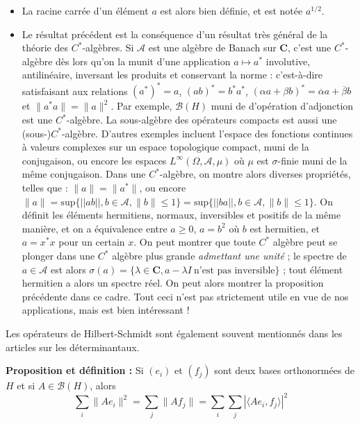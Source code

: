 \documentclass[12pt]{article}
\let\oldsum\sum
\renewcommand{\sum}{\oldsum\limits}
\begin{document}
\begin{itemize}

  \item La racine carrée d'un élément $a$ est alors bien définie, et est notée $ a^{1/2} $.
  
  \item Le résultat précédent est la conséquence d'un résultat très général de la théorie des $C^*$-algèbres. Si $ \mathcal A$ est une algèbre de Banach sur $\mathbf C$, c'est une $C^*$-algèbre dès lors qu'on la munit d'une application $ a \mapsto a^* $ involutive, antilinéaire, inversant les produits et conservant la norme : c'est-à-dire satisfaisant aux relations $ (a^*)^* = a$, $ (ab)^* = b^* a^* $,  $(\alpha a + \beta b)^* = \overline \alpha a + \overline \beta b $ et $ \| a^* a \| = \|a \|^2 $. Par exemple, $\mathcal B(H)$ muni de d'opération d'adjonction est une $ C^* $-algèbre. La sous-algèbre des opérateurs compacts est aussi une (sous-)$C^*$-algèbre. D'autres exemples incluent l'espace des fonctions continues à valeurs complexes sur un espace topologique compact, muni de la conjugaison, ou encore les espaces $ L^\infty(\Omega, \mathcal A, \mu) $ où $\mu$ est $\sigma$-finie muni de la même conjugaison. Dans une $C^*$-algèbre, on montre alors diverses propriétés, telles que : $ \|a \| = \|a^*\| $, ou encore $ \|a\| = \mathrm{sup} \{ ||ab||, b \in \mathcal A, \|b\| \leqslant 1\} = \mathrm{sup} \{ ||ba||, b \in \mathcal A, \|b\| \leqslant 1\} $. On définit les éléments hermitiens, normaux, inversibles et positifs de la même manière, et on a équivalence entre $ a \geqslant 0$, $ a = b^2 $ où $b$ est hermitien, et $a = x^*x $ pour un certain $x$. On peut montrer que toute $C^*$ algèbre peut se plonger dans une $C^*$ algèbre plus grande \textit{admettant une unité} ; le spectre de $ a \in \mathcal A $ est alors $ \sigma(a) = \{ \lambda \in \mathbf C, a - \lambda I \: \text{n'est pas inversible}\}$ ; tout élément hermitien a alors un spectre réel. On peut alors montrer la proposition précédente dans ce cadre. Tout ceci n'est pas strictement utile en vue de nos applications, mais est bien intéressant !

\end{itemize}




Les opérateurs de Hilbert-Schmidt sont également souvent mentionnés dans les articles sur les déterminantaux.

\textbf{Proposition et définition :} Si $(e_i)$ et $(f_j)$ sont deux bases orthonormées de $H$ et si $A \in \mathcal B(H) $, alors $$ \sum_i \|A e_i\|^2 = \sum_j \|A f_j\| = \sum_i \sum_j |\langle Ae_i, f_j \rangle|^2 $$
\end{document}
